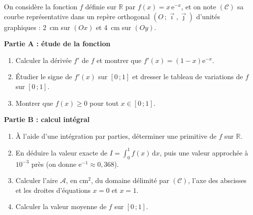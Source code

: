 \documentclass[11pt]{article}
\begin{document}
\begin{exercice}[Type Probatoire : étude de $f(x)=x\mathrm{e}^{-x}$]
On considère la fonction $f$ définie sur $\mathbb{R}$ par $f(x)=x\,\mathrm{e}^{-x}$, et on note $(\mathcal{C})$ sa courbe représentative dans un repère orthogonal $(O\,;\vec{\imath},\vec{\jmath})$ d'unités graphiques : \SI{2}{cm} sur $(Ox)$ et \SI{4}{cm} sur $(Oy)$.

\textbf{Partie A : étude de la fonction}
\begin{enumerate}
\item Calculer la dérivée $f'$ de $f$ et montrer que $f'(x)=(1-x)\mathrm{e}^{-x}$.
\item Étudier le signe de $f'(x)$ sur $[0\,;1]$ et dresser le tableau de variations de $f$ sur $[0\,;1]$.
\item Montrer que $f(x)\geq 0$ pour tout $x\in[0\,;1]$.
\end{enumerate}

\textbf{Partie B : calcul intégral}
\begin{enumerate}
\item À l'aide d'une intégration par parties, déterminer une primitive de $f$ sur $\mathbb{R}$.
\item En déduire la valeur exacte de $\displaystyle I=\int_0^1 f(x)\,\mathrm{d}x$, puis une valeur approchée à $10^{-3}$ près (on donne $\mathrm{e}^{-1}\approx 0{,}368$).
\item Calculer l'aire $\mathcal{A}$, en $\mathrm{cm}^2$, du domaine délimité par $(\mathcal{C})$, l'axe des abscisses et les droites d'équations $x=0$ et $x=1$.
\item Calculer la valeur moyenne de $f$ sur $[0\,;1]$.
\end{enumerate}
\end{exercice}
\end{document}

